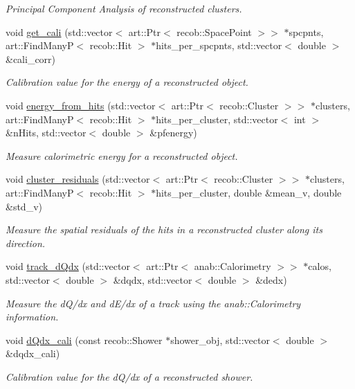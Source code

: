 \begin{DoxyCompactItemize}
\begin{DoxyCompactList}\small\item\em Principal Component Analysis of reconstructed clusters. \end{DoxyCompactList}\item 
void \hyperlink{group__lee_gaf141846d9be1716bcfcf351633bdf8e7}{get\-\_\-cali} (std\-::vector$<$ art\-::\-Ptr$<$ recob\-::\-Space\-Point $>$$>$ $\ast$spcpnts, art\-::\-Find\-Many\-P$<$ recob\-::\-Hit $>$ $\ast$hits\-\_\-per\-\_\-spcpnts, std\-::vector$<$ double $>$ \&cali\-\_\-corr)
\begin{DoxyCompactList}\small\item\em Calibration value for the energy of a reconstructed object. \end{DoxyCompactList}\item 
void \hyperlink{group__lee_gaabbb21a3db419c9580aec4976c5137a9}{energy\-\_\-from\-\_\-hits} (std\-::vector$<$ art\-::\-Ptr$<$ recob\-::\-Cluster $>$$>$ $\ast$clusters, art\-::\-Find\-Many\-P$<$ recob\-::\-Hit $>$ $\ast$hits\-\_\-per\-\_\-cluster, std\-::vector$<$ int $>$ \&n\-Hits, std\-::vector$<$ double $>$ \&pfenergy)
\begin{DoxyCompactList}\small\item\em Measure calorimetric energy for a reconstructed object. \end{DoxyCompactList}\item 
void \hyperlink{group__lee_ga01205d4a5d2f8d5ad0d4d5462e0b7563}{cluster\-\_\-residuals} (std\-::vector$<$ art\-::\-Ptr$<$ recob\-::\-Cluster $>$$>$ $\ast$clusters, art\-::\-Find\-Many\-P$<$ recob\-::\-Hit $>$ $\ast$hits\-\_\-per\-\_\-cluster, double \&mean\-\_\-v, double \&std\-\_\-v)
\begin{DoxyCompactList}\small\item\em Measure the spatial residuals of the hits in a reconstructed cluster along its direction. \end{DoxyCompactList}\item 
void \hyperlink{group__lee_ga27cd9ba04f447b9922c56bbb320bce08}{track\-\_\-d\-Qdx} (std\-::vector$<$ art\-::\-Ptr$<$ anab\-::\-Calorimetry $>$$>$ $\ast$calos, std\-::vector$<$ double $>$ \&dqdx, std\-::vector$<$ double $>$ \&dedx)
\begin{DoxyCompactList}\small\item\em Measure the d\-Q/dx and d\-E/dx of a track using the anab\-::\-Calorimetry information. \end{DoxyCompactList}\item 
void \hyperlink{group__lee_ga4926738bfba2d91bc187ad8a7db6e997}{d\-Qdx\-\_\-cali} (const recob\-::\-Shower $\ast$shower\-\_\-obj, std\-::vector$<$ double $>$ \&dqdx\-\_\-cali)
\begin{DoxyCompactList}\small\item\em Calibration value for the d\-Q/dx of a reconstructed shower. \end{DoxyCompactList}\end{DoxyCompactItemize}
